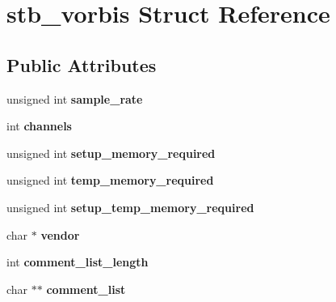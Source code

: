 \hypertarget{structstb__vorbis}{\section{stb\-\_\-vorbis Struct Reference}
\label{structstb__vorbis}
}
\subsection*{Public Attributes}
\begin{DoxyCompactItemize}
\item 
\hypertarget{structstb__vorbis_aea5df8cb01245c5a3658f2b48cd74ad1}{unsigned int {\bfseries sample\-\_\-rate}}\label{structstb__vorbis_aea5df8cb01245c5a3658f2b48cd74ad1}

\item 
\hypertarget{structstb__vorbis_ad7f03b7568a58e7c92f3a867a1030df3}{int {\bfseries channels}}\label{structstb__vorbis_ad7f03b7568a58e7c92f3a867a1030df3}

\item 
\hypertarget{structstb__vorbis_af6552029487a8eb38da473b0cc6a60c6}{unsigned int {\bfseries setup\-\_\-memory\-\_\-required}}\label{structstb__vorbis_af6552029487a8eb38da473b0cc6a60c6}

\item 
\hypertarget{structstb__vorbis_a8ed60a85b7e09e19b5eee4068cd983f1}{unsigned int {\bfseries temp\-\_\-memory\-\_\-required}}\label{structstb__vorbis_a8ed60a85b7e09e19b5eee4068cd983f1}

\item 
\hypertarget{structstb__vorbis_a52b6994c72625b043f9ae3fa0bc40893}{unsigned int {\bfseries setup\-\_\-temp\-\_\-memory\-\_\-required}}\label{structstb__vorbis_a52b6994c72625b043f9ae3fa0bc40893}

\item 
\hypertarget{structstb__vorbis_a34ef41a9d003edf14762835badef21d5}{char $\ast$ {\bfseries vendor}}\label{structstb__vorbis_a34ef41a9d003edf14762835badef21d5}

\item 
\hypertarget{structstb__vorbis_a42307fb1bb6efa514afc2d0e6d5b9a04}{int {\bfseries comment\-\_\-list\-\_\-length}}\label{structstb__vorbis_a42307fb1bb6efa514afc2d0e6d5b9a04}

\item 
\hypertarget{structstb__vorbis_afc7c27ee48d18699ce090368efdf45c4}{char $\ast$$\ast$ {\bfseries comment\-\_\-list}}\label{structstb__vorbis_afc7c27ee48d18699ce090368efdf45c4}


\end{DoxyCompactItemize}
